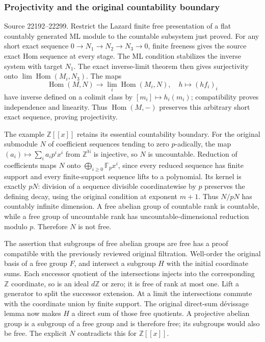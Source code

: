 \subsubsection{Projectivity and the original countability boundary}\label{projectivity-and-the-original-countability-boundary}

Source 22192--22299. Restrict the Lazard finite free presentation of a flat countably generated ML module to the countable subsystem just proved. For any short exact sequence \(0\to N_1\to N_2\to N_3\to0\), finite freeness gives the source exact Hom sequence at every stage. The ML condition stabilizes the inverse system with target \(N_1\). The exact inverse-limit theorem then gives surjectivity onto \(\lim\operatorname{Hom}(M_i,N_3)\). The maps \[
\operatorname{Hom}(M,N)\longrightarrow\lim_i\operatorname{Hom}(M_i,N),
\quad h\longmapsto(hf_i)_i
\] have inverse defined on a colimit class by \([m_i]\mapsto h_i(m_i)\); compatibility proves independence and linearity. Thus \(\operatorname{Hom}(M,-)\) preserves this arbitrary short exact sequence, proving projectivity.

The example \(\mathbb Z[[x]]\) retains its essential countability boundary. For the original submodule \(N\) of coefficient sequences tending to zero \(p\)-adically, the map \((a_i)\mapsto\sum_i a_i p^i x^i\) from \(\mathbb Z^{\mathbb N}\) is injective, so \(N\) is uncountable. Reduction of coefficients maps \(N\) onto \(\bigoplus_{i\geq0}\mathbb F_p x^i\), since every reduced sequence has finite support and every finite-support sequence lifts to a polynomial. Its kernel is exactly \(pN\): division of a sequence divisible coordinatewise by \(p\) preserves the defining decay, using the original condition at exponent \(m+1\). Thus \(N/pN\) has countably infinite dimension. A free abelian group of countable rank is countable, while a free group of uncountable rank has uncountable-dimensional reduction modulo \(p\). Therefore \(N\) is not free.

The assertion that subgroups of free abelian groups are free has a proof compatible with the previously reviewed original filtration. Well-order the original basis of a free group \(F\), and intersect a subgroup \(H\) with the initial coordinate sums. Each successor quotient of the intersections injects into the corresponding \(\mathbb Z\) coordinate, so is an ideal \(d\mathbb Z\) or zero; it is free of rank at most one. Lift a generator to split the successor extension. At a limit the intersections commute with the coordinate union by finite support. The original direct-sum dévissage lemma now makes \(H\) a direct sum of those free quotients. A projective abelian group is a subgroup of a free group and is therefore free; its subgroups would also be free. The explicit \(N\) contradicts this for \(\mathbb Z[[x]]\).

